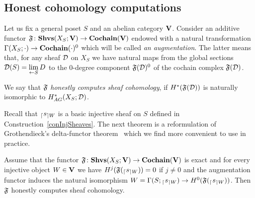 \subsection{Honest cohomology computations}\label{subsecMathHonestComputations}

Let us fix a general poset $S$ and an abelian category $\mathbf{V}$. Consider an additive functor $\mathfrak{F}\colon \mathbf{Shvs}(X_S;\mathbf{V})\to\mathbf{Cochain}(\mathbf{V})$ endowed with a natural transformation $\Gamma(X_S;\cdot)\to \mathbf{Cochain}(\cdot)^0$ which will be called \emph{an augmentation}. The latter means that, for any sheaf $\mathcal{D}$ on $X_S$ we have natural maps from the global sections $\mathcal{D}(S)=\lim\limits_{\leftarrow S}D$ to the 0-degree component $\mathfrak{F}(\mathcal{D})^0$ of the cochain complex $\mathfrak{F}(\mathcal{D})$.

\begin{defin}\label{definHonestlyComputes}
We say that $\mathfrak{F}$ \emph{honestly computes sheaf cohomology}, if $H^*(\mathfrak{F}(\mathcal{D}))$ is naturally isomorphic to $H_{AG}^*(X_S;\mathcal{D})$.
\end{defin}

Recall that ${_{\lceil}s_{\rceil W}}$ is a basic injective sheaf on $S$ defined in Construction~\ref{conInjSheaves}. The next theorem is a reformulation of Grothendieck's delta-functor theorem~\cite[Thm.2.2.2]{grothendieck1957tohoku} which we find more convenient to use in practice.

\begin{thm}\label{thmHonestCohomology}
Assume that the functor $\mathfrak{F}\colon \mathbf{Shvs}(X_S;\mathbf{V})\to\mathbf{Cochain}(\mathbf{V})$ is exact and for every injective object $W\in\mathbf{V}$ we have $H^j(\mathfrak{F}({_{\lceil}s_{\rceil W}}))=0$ if $j\neq 0$ and the augmentation functor induces the natural isomorphism $W=\Gamma(S;{_{\lceil}s_{\rceil W}})\to H^0(\mathfrak{F}({_{\lceil}s_{\rceil W}}))$. Then $\mathfrak{F}$ honestly computes sheaf cohomology.
\end{thm}


